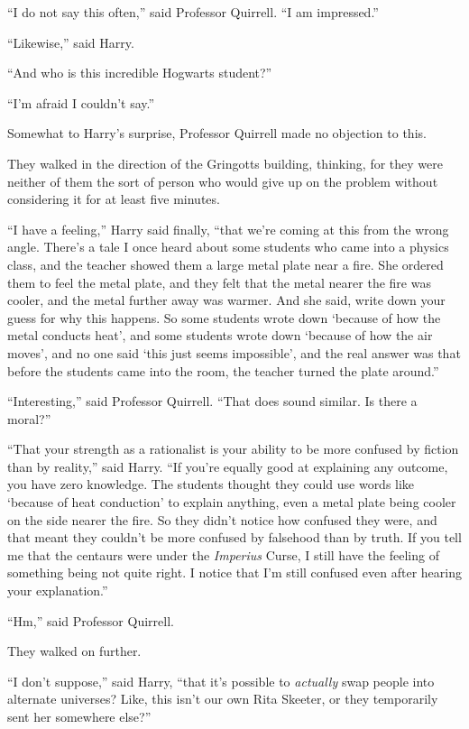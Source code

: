“I do not say this often,” said Professor Quirrell. “I am impressed.”

“Likewise,” said Harry.

“And who is this incredible Hogwarts student?”

“I’m afraid I couldn’t say.”

Somewhat to Harry’s surprise, Professor Quirrell made no objection to this.

They walked in the direction of the Gringotts building, thinking, for they were neither of them the sort of person who would give up on the problem without considering it for at least five minutes.

“I have a feeling,” Harry said finally, “that we’re coming at this from the wrong angle. There’s a tale I once heard about some students who came into a physics class, and the teacher showed them a large metal plate near a fire. She ordered them to feel the metal plate, and they felt that the metal nearer the fire was cooler, and the metal further away was warmer. And she said, write down your guess for why this happens. So some students wrote down ‘because of how the metal conducts heat’, and some students wrote down ‘because of how the air moves’, and no one said ‘this just seems impossible’, and the real answer was that before the students came into the room, the teacher turned the plate around.”

“Interesting,” said Professor Quirrell. “That does sound similar. Is there a moral?”

“That your strength as a rationalist is your ability to be more confused by fiction than by reality,” said Harry. “If you’re equally good at explaining any outcome, you have zero knowledge. The students thought they could use words like ‘because of heat conduction’ to explain anything, even a metal plate being cooler on the side nearer the fire. So they didn’t notice how confused they were, and that meant they couldn’t be more confused by falsehood than by truth. If you tell me that the centaurs were under the \emph{Imperius} Curse, I still have the feeling of something being not quite right. I notice that I’m still confused even after hearing your explanation.”

“Hm,” said Professor Quirrell.

They walked on further.

“I don’t suppose,” said Harry, “that it’s possible to \emph{actually} swap people into alternate universes? Like, this isn’t our own Rita Skeeter, or they temporarily sent her somewhere else?”

